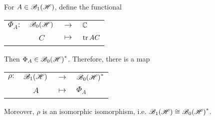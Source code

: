 \begin{thm}
	For $A \in \mathscr{B}_{1}\mathscr{(H)}$, define the functional
	\begin{center}
		\begin{tabular}{l c c l}
			$\Phi_A \colon$ & $\mathscr{B}_{0}\mathscr{(H)}$ & $\longrightarrow$ & $\mathbb{C}$ \\
			~ & $C$ & $\longmapsto$ & $\operatorname{tr}{AC}$
		\end{tabular}
	\end{center}
	Then $\Phi_A \in \mathscr{B}_{0}\mathscr{(H)}^{*}$. Therefore, there is a map
	\begin{center}
		\begin{tabular}{l c c l}
			$\rho \colon$ & $\mathscr{B}_{1}\mathscr{(H)}$ & $\longrightarrow$ & $\mathscr{B}_{0}\mathscr{(H)}^{*}$ \\
			~ & $A$ & $\longmapsto$ & $\Phi_A$
		\end{tabular}
	\end{center}
	Moreover, $\rho$ is an isomorphic isomorphism, i.e. $\mathscr{B}_{1}\mathscr{(H)} \cong \mathscr{B}_{0}\mathscr{(H)}^{*}$. 
\end{thm}
